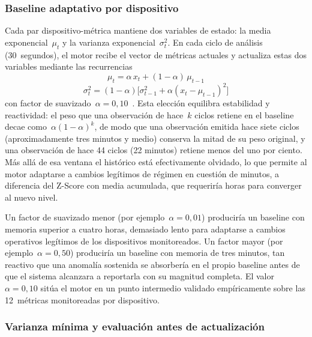 \subsubsection{Baseline adaptativo por dispositivo}

Cada par dispositivo-métrica mantiene dos variables de estado: la 
media exponencial~\(\mu_t\) y la varianza exponencial~\(\sigma^2_t\). 
En cada ciclo de análisis (30~segundos), el motor recibe el vector 
de métricas actuales y actualiza estas dos variables mediante las 
recurrencias
\begin{equation}
\mu_t = \alpha\, x_t + (1-\alpha)\, \mu_{t-1}
\label{eq:ewma-impl}
\end{equation}
\begin{equation}
\sigma^2_t = (1-\alpha)\bigl[\sigma^2_{t-1} + \alpha(x_t - \mu_{t-1})^2\bigr]
\label{eq:ewmv-impl}
\end{equation}
con factor de suavizado~\(\alpha = 0{,}10\)~\cite{lucas1990ewma,roberts1959ewma}. 
Esta elección equilibra estabilidad y reactividad: el peso que una 
observación de hace~\(k\) ciclos retiene en el baseline decae como~\(\alpha(1-\alpha)^k\), 
de modo que una observación emitida hace 
siete ciclos (aproximadamente tres minutos y medio) conserva la mitad 
de su peso original, y una observación de hace 44 ciclos (22 minutos) 
retiene menos del uno por ciento. Más allá de esa ventana el histórico 
está efectivamente olvidado, lo que permite al motor adaptarse a 
cambios legítimos de régimen en cuestión de minutos, a diferencia del 
Z-Score con media acumulada, que requeriría horas para converger al 
nuevo nivel.

Un factor de suavizado menor (por ejemplo~\(\alpha = 0{,}01\)) 
produciría un baseline con memoria superior a cuatro horas, 
demasiado lento para adaptarse a cambios operativos legítimos de los 
dispositivos monitoreados. Un factor mayor (por ejemplo~\(\alpha = 0{,}50\)) 
produciría un baseline con memoria de tres minutos, tan 
reactivo que una anomalía sostenida se absorbería en el propio 
baseline antes de que el sistema alcanzara a reportarla con su 
magnitud completa. El valor~\(\alpha = 0{,}10\) sitúa el motor en 
un punto intermedio validado empíricamente sobre las 12~métricas 
monitoreadas por dispositivo.

\subsubsection{Varianza mínima y evaluación antes de actualización}

